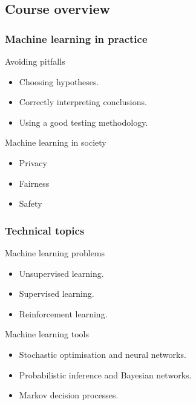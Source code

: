 \subsection{Course overview}

\begin{frame}
  \frametitle{Machine learning in practice}
  \begin{block}{Avoiding pitfalls}
    \begin{itemize}
    \item Choosing hypotheses.
    \item Correctly interpreting conclusions.
    \item Using a good testing methodology.
    \end{itemize}
  \end{block}
  \begin{block}{Machine learning in society}
    \begin{itemize}
    \item<alert@2> Privacy 
    \item<alert@3> Fairness 
    \item<alert@4> Safety 
    \end{itemize}
  \end{block}
\end{frame}



\begin{frame}
  \frametitle{Technical topics}
  
  \begin{block}{Machine learning problems}
    \begin{itemize}
    \item Unsupervised learning.
    \item Supervised learning.
    \item Reinforcement learning.
    \end{itemize}
  \end{block}

  \begin{block}{Machine learning tools}
    \begin{itemize}
    \item Stochastic optimisation and neural networks.
    \item Probabilistic inference and Bayesian networks.
    \item Markov decision processes.
    \end{itemize}
  \end{block}
\end{frame}

